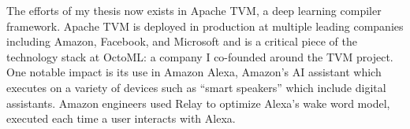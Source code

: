 \begin{fullwidth}
\begin{center}
The efforts of my thesis now exists in Apache TVM, a deep learning compiler framework.
Apache TVM is deployed in production at multiple leading companies including
  Amazon, Facebook, and Microsoft and is a critical piece of the technology stack
  at OctoML: a company I co-founded around the TVM project.
One notable impact is its use in Amazon Alexa, Amazon's AI assistant
  which executes on a variety of devices such as ``smart speakers'' which include
  digital assistants.
Amazon engineers used Relay to optimize Alexa’s wake word model,
  executed each time a user interacts with Alexa.

\end{center}
\end{fullwidth}
